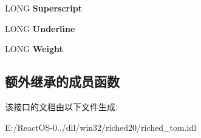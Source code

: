 \begin{DoxyCompactItemize}
\mbox{\label{interfacetom_1_1_i_text_font_a21ca899099f252f315dc657193555404}} 
L\+O\+NG {\bfseries Superscript}
\item 
\mbox{\label{interfacetom_1_1_i_text_font_acbdf69e15cd19acf23901db44a67477d}} 
L\+O\+NG {\bfseries Underline}
\item 
\mbox{\label{interfacetom_1_1_i_text_font_aa914348c626fd8be1fe64117da8ea3e3}} 
L\+O\+NG {\bfseries Weight}
\end{DoxyCompactItemize}
\subsection*{额外继承的成员函数}


该接口的文档由以下文件生成\+:\begin{DoxyCompactItemize}
\item 
E\+:/\+React\+O\+S-\/0../dll/win32/riched20/riched\+\_\+tom.\+idl\end{DoxyCompactItemize}
